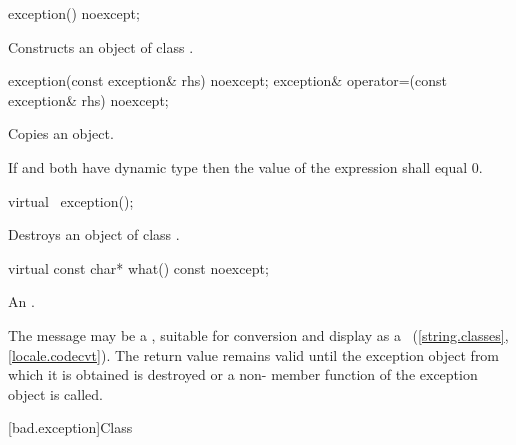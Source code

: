 %
\begin{itemdecl}
exception() noexcept;
\end{itemdecl}

\begin{itemdescr}
\pnum
\effects
Constructs an object of class
.
\end{itemdescr}

%
%
\begin{itemdecl}
exception(const exception& rhs) noexcept;
exception& operator=(const exception& rhs) noexcept;
\end{itemdecl}

\begin{itemdescr}
\pnum
\effects
Copies an
object.

\pnum
\ensures If  and  both have dynamic type 
then the value of the expression  shall equal 0.
\end{itemdescr}

%
\begin{itemdecl}
virtual ~exception();
\end{itemdecl}

\begin{itemdescr}
\pnum
\effects
Destroys an object of class
.
\end{itemdescr}

%
\begin{itemdecl}
virtual const char* what() const noexcept;
\end{itemdecl}

\begin{itemdescr}
\pnum
\returns
An  \ntbs{}.

\pnum
\remarks
The message may be a
,
suitable for conversion and display as a
~(\ref{string.classes}, \ref{locale.codecvt}).
The return value remains valid until the exception object from which
it is obtained is destroyed or a non-
member function of the exception object is called.
\end{itemdescr}

[bad.exception]{Class }

